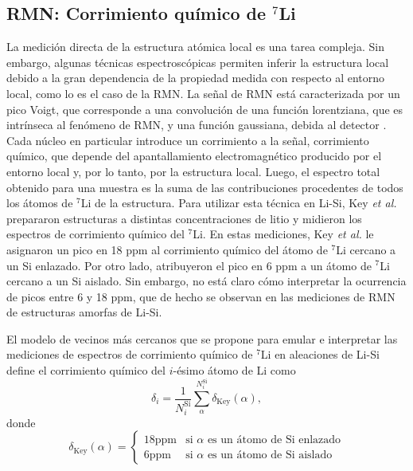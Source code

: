 \subsection{RMN: Corrimiento químico de $^7$Li}

La medición directa de la estructura atómica local es una tarea compleja. Sin
embargo, algunas técnicas espectroscópicas permiten inferir la estructura local 
debido a la gran dependencia de la propiedad medida con respecto al entorno local, 
como lo es el caso de la RMN. La señal de RMN está caracterizada por un pico 
Voigt, que corresponde a una convolución de una función lorentziana, que 
es intrínseca al fenómeno de RMN, y una función gaussiana, debida al detector
\cite{higinbotham2001}. Cada núcleo en particular introduce un corrimiento a la 
señal, corrimiento químico, que depende del apantallamiento electromagnético 
producido por el entorno local y, por lo tanto, por la estructura local. Luego,
el espectro total obtenido para una muestra es la suma de las contribuciones 
procedentes de todos los átomos de $^7$Li de la estructura. Para utilizar esta 
técnica en Li-Si, Key \textit{et al.} \cite{key2009} prepararon estructuras
a distintas concentraciones de litio y midieron los espectros de corrimiento 
químico del $^7$Li. En estas mediciones, Key \textit{et al.} \cite{key2009} 
le asignaron un pico en 18 ppm al corrimiento químico del átomo de $^7$Li 
cercano a un Si enlazado. Por otro lado, atribuyeron el pico en 6 ppm a un 
átomo de $^7$Li cercano a un Si aislado. Sin embargo, no está claro cómo 
interpretar la ocurrencia de picos entre 6 y 18 ppm, que de hecho se observan 
en las mediciones de RMN de estructuras amorfas de Li-Si.

El modelo de vecinos más cercanos que se propone para emular e interpretar las 
mediciones de espectros de corrimiento químico de $^7$Li en aleaciones de Li-Si 
define el corrimiento químico del $i$-ésimo átomo de Li como
\begin{equation}\label{eq:dli}
    \delta_{i} = \frac{1}{N_i^{\text{Si}}} \sum^{N_i^{\text{Si}}}_{\alpha} \delta_{\text{Key}}(\alpha),
\end{equation}
donde
\begin{equation}\label{eq:dkey}
    \delta_{\text{Key}}(\alpha)=\begin{cases}
    18 \text{ppm} & \text{si } \alpha \text{ es un átomo de Si enlazado}\\
    6 \text{ppm} & \text{si } \alpha \text{ es un átomo de Si aislado} 
    \end{cases}
\end{equation}


